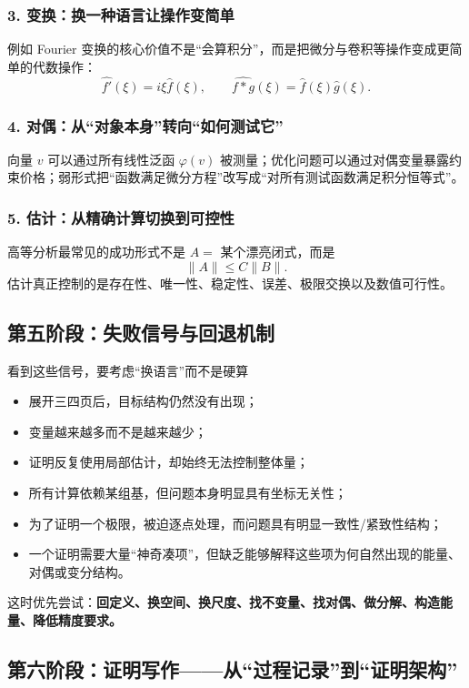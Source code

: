 \documentclass[11pt,a4paper]{ctexart}
\begin{document}
\subsubsection*{3. 变换：换一种语言让操作变简单}
例如 Fourier 变换的核心价值不是“会算积分”，而是把微分与卷积等操作变成更简单的代数操作：
\[
\widehat{f'}(\xi)=i\xi\widehat f(\xi),\qquad
\widehat{f*g}(\xi)=\widehat f(\xi)\widehat g(\xi).
\]

\subsubsection*{4. 对偶：从“对象本身”转向“如何测试它”}
向量 $v$ 可以通过所有线性泛函 $\varphi(v)$ 被测量；优化问题可以通过对偶变量暴露约束价格；弱形式把“函数满足微分方程”改写成“对所有测试函数满足积分恒等式”。

\subsubsection*{5. 估计：从精确计算切换到可控性}
高等分析最常见的成功形式不是 $A=$ 某个漂亮闭式，而是
\[
\lVert A\rVert\le C\lVert B\rVert.
\]
估计真正控制的是存在性、唯一性、稳定性、误差、极限交换以及数值可行性。

\subsection{第五阶段：失败信号与回退机制}

\begin{checkbox}{看到这些信号，要考虑“换语言”而不是硬算}
\begin{itemize}
  \item 展开三四页后，目标结构仍然没有出现；
  \item 变量越来越多而不是越来越少；
  \item 证明反复使用局部估计，却始终无法控制整体量；
  \item 所有计算依赖某组基，但问题本身明显具有坐标无关性；
  \item 为了证明一个极限，被迫逐点处理，而问题具有明显一致性/紧致性结构；
  \item 一个证明需要大量“神奇凑项”，但缺乏能够解释这些项为何自然出现的能量、对偶或变分结构。
\end{itemize}
\end{checkbox}

这时优先尝试：\textbf{回定义、换空间、换尺度、找不变量、找对偶、做分解、构造能量、降低精度要求。}

\subsection{第六阶段：证明写作——从“过程记录”到“证明架构”}
\end{document}

